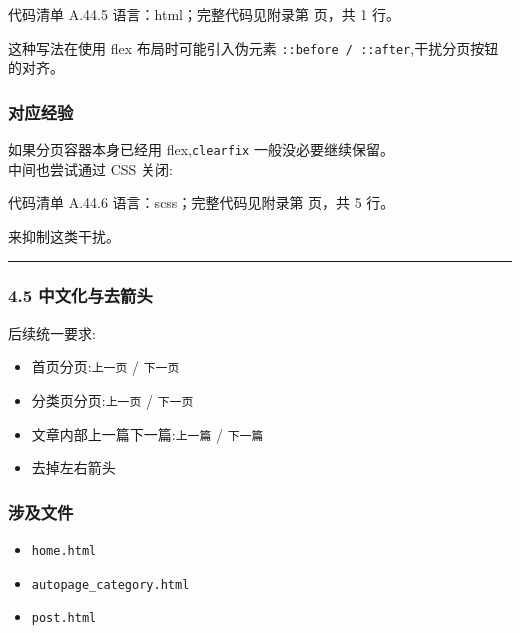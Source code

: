 \documentclass[lang=cn,scheme=chinese,color=blue,device=normal,toc=onecol,math=cm]{elegantbook}
\begin{document}
\begin{codeindexbox}{代码清单 A.44.5}
语言：html；完整代码见附录第 \pageref{code:44:5} 页，共 1 行。
\end{codeindexbox}


这种写法在使用 flex 布局时可能引入伪元素 \texttt{::before /\allowbreak{} ::after},干扰分页按钮的对齐。\par


\subsubsection{对应经验}


如果分页容器本身已经用 flex,\texttt{clearfix} 一般没必要继续保留。\\ 中间也尝试通过 CSS 关闭:\par


\begin{codeindexbox}{代码清单 A.44.6}
语言：scss；完整代码见附录第 \pageref{code:44:6} 页，共 5 行。
\end{codeindexbox}


来抑制这类干扰。\par


\medskip\hrule\medskip


\subsubsection{4.5 中文化与去箭头}


后续统一要求:\par


\begin{itemize}
\item 首页分页:\texttt{上一页} /\allowbreak{} \texttt{下一页}
\item 分类页分页:\texttt{上一页} /\allowbreak{} \texttt{下一页}
\item 文章内部上一篇下一篇:\texttt{上一篇} /\allowbreak{} \texttt{下一篇}
\item 去掉左右箭头
\end{itemize}


\subsubsection{涉及文件}


\begin{itemize}
\item \texttt{home.html}
\item \texttt{autopage\_\allowbreak{}category.html}
\item \texttt{post.html}
\end{itemize}
\end{document}
